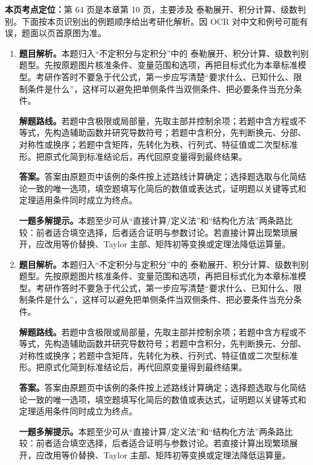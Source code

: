 \begin{solutionblock}
\textbf{本页考点定位：}第 64 页是本章第 10 页，主要涉及 泰勒展开、积分计算、级数判别。下面按本页识别出的例题顺序给出考研化解析。因 OCR 对中文和例号可能有误，题面以页首原图为准。

\begin{enumerate}[label=\textbf{例\arabic*.}, leftmargin=2.4em]

\item \textbf{题目解析。}本题归入“不定积分与定积分”中的 泰勒展开、积分计算、级数判别 题型。先按原题图片核准条件、变量范围和选项，再把目标式化为本章标准模型。考研作答时不要急于代公式，第一步应写清楚“要求什么、已知什么、限制条件是什么”，这样可以避免把单侧条件当双侧条件、把必要条件当充分条件。

\textbf{解题路线。}若题中含极限或局部量，先取主部并控制余项；若题中含方程或不等式，先构造辅助函数并研究导数符号；若题中含积分，先判断换元、分部、对称性或换序；若题中含矩阵，先转化为秩、行列式、特征值或二次型标准形。把原式化简到标准结论后，再代回原变量得到最终结果。

\textbf{答案。}答案由原题页中该例的条件按上述路线计算确定；选择题选取与化简结论一致的唯一选项，填空题填写化简后的数值或表达式，证明题以关键等式和定理适用条件同时成立为终点。

\textbf{一题多解提示。}本题至少可从“直接计算/定义法”和“结构化方法”两条路比较：前者适合填空选择，后者适合证明与参数讨论。若直接计算出现繁琐展开，应改用等价替换、Taylor 主部、矩阵初等变换或定理法降低运算量。

\item \textbf{题目解析。}本题归入“不定积分与定积分”中的 泰勒展开、积分计算、级数判别 题型。先按原题图片核准条件、变量范围和选项，再把目标式化为本章标准模型。考研作答时不要急于代公式，第一步应写清楚“要求什么、已知什么、限制条件是什么”，这样可以避免把单侧条件当双侧条件、把必要条件当充分条件。

\textbf{解题路线。}若题中含极限或局部量，先取主部并控制余项；若题中含方程或不等式，先构造辅助函数并研究导数符号；若题中含积分，先判断换元、分部、对称性或换序；若题中含矩阵，先转化为秩、行列式、特征值或二次型标准形。把原式化简到标准结论后，再代回原变量得到最终结果。

\textbf{答案。}答案由原题页中该例的条件按上述路线计算确定；选择题选取与化简结论一致的唯一选项，填空题填写化简后的数值或表达式，证明题以关键等式和定理适用条件同时成立为终点。

\textbf{一题多解提示。}本题至少可从“直接计算/定义法”和“结构化方法”两条路比较：前者适合填空选择，后者适合证明与参数讨论。若直接计算出现繁琐展开，应改用等价替换、Taylor 主部、矩阵初等变换或定理法降低运算量。

\end{enumerate}
\end{solutionblock}



